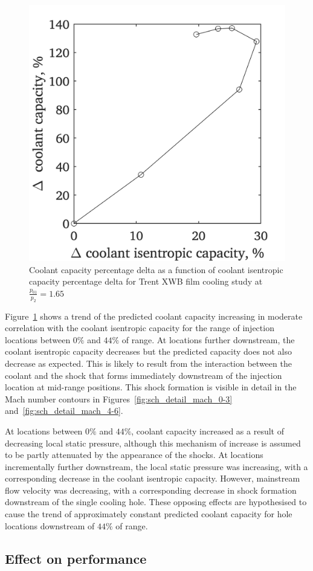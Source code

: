 \documentclass[a4paper, 11pt, oneside]{report}
\begin{document}
\begin{figure}[H]
      \centering
      \includegraphics[width=.45\textwidth]{figs/sch_coolant_isentropic_capacity_vs_coolant_capacity.png}
      \caption{Coolant capacity percentage delta as a function of coolant isentropic capacity percentage delta for Trent XWB film cooling study at $\frac{p_{01}}{p_2}=1.65$}
      \label{fig:sch_coolant_isentropic_capacity_vs_coolant_capacity}
\end{figure}

Figure~\ref{fig:sch_coolant_isentropic_capacity_vs_coolant_capacity} shows a trend of the predicted coolant capacity increasing in moderate correlation with the coolant isentropic capacity for the range of injection locations between $0\%$ and $44\%$ of range. At locations further downstream, the coolant isentropic capacity decreases but the predicted capacity does not also decrease as expected. This is likely to result from the interaction between the coolant and the shock that forms immediately downstream of the injection location at mid-range positions. This shock formation is visible in detail in the Mach number contours in Figures~\ref{fig:sch_detail_mach_0-3} and~\ref{fig:sch_detail_mach_4-6}. 

At locations between $0\%$ and $44\%$, coolant capacity increased as a result of decreasing local static pressure, although this mechanism of increase is assumed to be partly attenuated by the appearance of the shocks. At locations incrementally further downstream, the local static pressure was increasing, with a corresponding decrease in the coolant isentropic capacity. However, mainstream flow velocity was decreasing, with a corresponding decrease in shock formation downstream of the single cooling hole. These opposing effects are hypothesised to cause the trend of approximately constant predicted coolant capacity for hole locations downstream of $44\%$ of range.

\subsection{Effect on performance}
    
\end{document}
